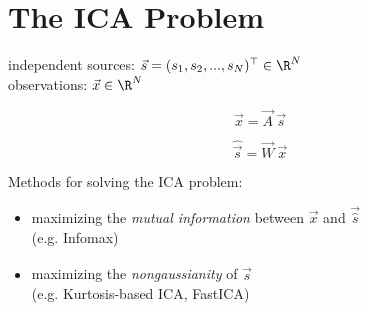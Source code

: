
\section{The ICA Problem}
\begin{frame}{\secname}

independent sources: $\vec s = (s_1, s_2,...,s_N)^\top \in \R^N$\\
observations: $\vec x \in \R^N$

\begin{equation}
\label{eq:ica}
\vec x = \vec A~\vec s
\end{equation}

\begin{equation}
\widehat{\vec s} = \vec W~\vec x
\end{equation}

Methods for solving the ICA problem:

\begin{itemize}
\item maximizing the \emph{mutual information} between $\vec x$ and $\vec {\widehat s}$ \\
(e.g. Infomax)
\item maximizing the \emph{nongaussianity} of $\widehat {\vec s}$ \\
(e.g. Kurtosis-based ICA, FastICA)
\end{itemize}
\end{frame}


